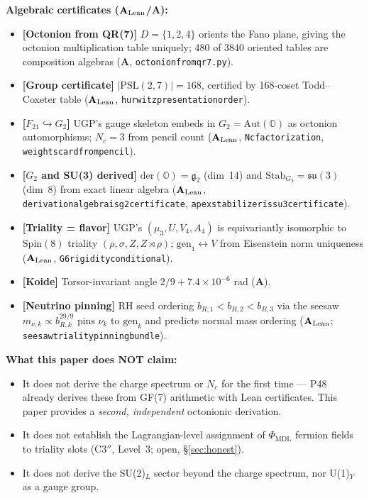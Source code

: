 \documentclass[11pt]{article}
\theoremstyle{remark}
\newcommand{\PHIMDL}{\Phi_{\mathrm{MDL}}}
\newcommand{\lean}[1]{%
  \penalty-100
  \begingroup\def\_{\textunderscore\allowbreak}\texttt{#1}\endgroup}
\newcommand{\CatA}{\textbf{A}}
\newcommand{\CatAL}{\ensuremath{\textbf{A}_{\rm Lean}}}
\begin{document}
\begin{tcolorbox}[colback=orange!8,colframe=orange!60!black,
  title={\textbf{What this paper claims}},
  fonttitle=\bfseries,left=6pt,right=6pt,top=5pt,bottom=5pt,breakable]
\small
\textbf{Algebraic certificates (\CatAL/\CatA):}
\begin{itemize}[noitemsep,topsep=2pt]
  \item \textbf{[Octonion from QR(7)]} $D = \{1,2,4\}$ orients the Fano plane,
        giving the octonion multiplication table uniquely; 480 of 3840 oriented tables
        are composition algebras (\CatA, \lean{octonion\_from\_qr7.py}).
  \item \textbf{[Group certificate]} $|\mathrm{PSL}(2,7)| = 168$, certified by
        168-coset Todd--Coxeter table (\CatAL,
        \lean{hurwitz\_presentation\_order\_168}).
  \item \textbf{[$F_{21}\hookrightarrow G_2$]} UGP's gauge skeleton embeds in $G_2 = \mathrm{Aut}(\mathbb{O})$
        as octonion automorphisms; $N_c = 3$ from pencil count
        (\CatAL, \lean{Nc\_factorization}, \lean{weights\_card\_from\_pencil}).
  \item \textbf{[$G_2$ and SU(3) derived]} $\mathrm{der}(\mathbb{O}) = \mathfrak{g}_2$
        (dim~14) and $\mathrm{Stab}_{G_2} = \mathfrak{su}(3)$ (dim~8) from exact
        linear algebra (\CatAL, \lean{derivation\_algebra\_is\_g2\_certificate},
        \lean{apex\_stabilizer\_is\_su3\_certificate}).
  \item \textbf{[Triality = flavor]} UGP's $(\mu_3, U, V_4, A_4)$ is equivariantly
        isomorphic to $\mathrm{Spin}(8)$ triality $(\rho,\sigma,Z,Z\!\rtimes\!\rho)$;
        $\mathrm{gen}_1\leftrightarrow V$ from Eisenstein norm uniqueness
        (\CatAL, \lean{G6\_rigidity\_conditional}).
  \item \textbf{[Koide]} Torsor-invariant angle $2/9 + 7.4\times10^{-6}$ rad (\CatA).
  \item \textbf{[Neutrino pinning]} RH seed ordering $b_{R,1}<b_{R,2}<b_{R,3}$ via the
        seesaw $m_{\nu,k}\propto b_{R,k}^{29/9}$ pins $\nu_k$ to $\mathrm{gen}_k$
        and predicts normal mass ordering (\CatAL;
        \lean{seesaw\_triality\_pinning\_bundle}).
\end{itemize}
\textbf{What this paper does NOT claim:}
\begin{itemize}[noitemsep,topsep=2pt]
  \item It does not derive the charge spectrum or $N_c$ for the first time ---
        P48~\cite{SpivackGTECompleteFramework} already derives these from GF(7)
        arithmetic with Lean certificates. This paper provides a \emph{second,
        independent} octonionic derivation.
  \item It does not establish the Lagrangian-level assignment of $\PHIMDL$ fermion
        fields to triality slots (C$3''$, Level~3; open, \S\ref{sec:honest}).
  \item It does not derive the SU(2)$_L$ sector beyond the charge spectrum, nor
        U(1)$_Y$ as a gauge group.
\end{itemize}
\end{tcolorbox}
\end{document}
